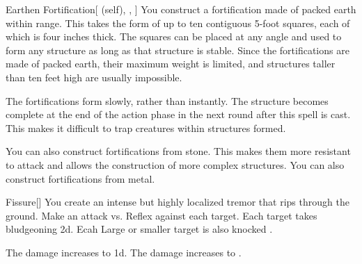 \lowercase{\hypertarget{spell:Earthen Fortification}{}}\label{spell:Earthen Fortification}
\begin{attuneability}[Rank 4]{\hypertarget{spell:Earthen Fortification}{Earthen Fortification}}[ (self), , ]
\targetrule
You construct a fortification made of packed earth within \rngmed range.
This takes the form of up to ten contiguous 5-foot squares, each of which is four inches thick.
The squares can be placed at any angle and used to form any structure as long as that structure is stable.
Since the fortifications are made of packed earth, their maximum weight is limited, and structures taller than ten feet high are usually impossible.

The fortifications form slowly, rather than instantly.
The structure becomes complete at the end of the action phase in the next round after this spell is cast.
This makes it difficult to trap creatures within structures formed.

\rankline
{} You can also construct fortifications from stone.
This makes them more resistant to attack and allows the construction of more complex structures.
 You can also construct fortifications from metal.
\end{attuneability}
\vspace{0.25em}



\lowercase{\hypertarget{spell:Fissure}{}}\label{spell:Fissure}
\begin{freeability}[Rank 4]{\hypertarget{spell:Fissure}{Fissure}}[]
You create an intense but highly localized tremor that rips through the ground.
Make an attack vs. Reflex against each target.
\hit Each target takes bludgeoning  \minus2d.
Ecah Large or smaller target is also knocked .

\rankline
{} The damage increases to  \minus1d.
 The damage increases to .
\end{freeability}
\vspace{0.25em}



